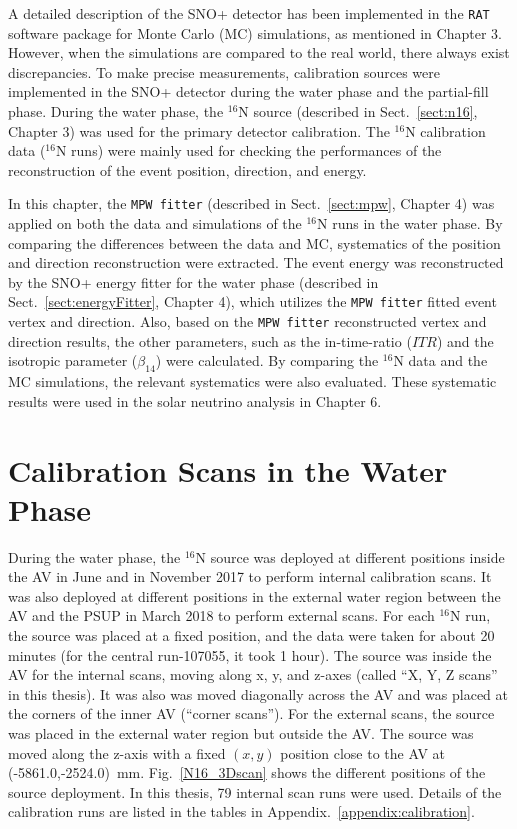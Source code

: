 A detailed description of the SNO+ detector has been implemented in the \texttt{RAT} software package for Monte Carlo (MC) simulations, as mentioned in Chapter 3. However, when the simulations are compared to the real world, there always exist discrepancies. To make precise measurements, calibration sources were implemented in the SNO+ detector during the water phase and the partial-fill phase. During the water phase, the $^{16}$N source (described in Sect.~\ref{sect:n16}, Chapter 3) was used for the primary detector calibration. The $^{16}$N calibration data ($^{16}$N runs) were mainly used for checking the performances of the reconstruction of the event position, direction, and energy. 

In this chapter, the \texttt{MPW fitter} (described in Sect.~\ref{sect:mpw}, Chapter 4) was applied on both the data and simulations of the $^{16}$N runs in the water phase. By comparing the differences between the data and MC, systematics of the position and direction reconstruction were extracted. The event energy was reconstructed by the SNO+ energy fitter for the water phase (described in Sect.~\ref{sect:energyFitter}, Chapter 4), which utilizes the \texttt{MPW fitter} fitted event vertex and direction. Also, based on the \texttt{MPW fitter} reconstructed vertex and direction results, the other parameters, such as the in-time-ratio ($ITR$) and the isotropic parameter ($\beta_{14}$) were calculated. By comparing the $^{16}$N data and the MC simulations, the relevant systematics were also evaluated. These systematic results were used in the solar neutrino analysis in Chapter 6.

\section{ Calibration Scans in the Water Phase}\label{sect:n16_water}
During the water phase, the $^{16}$N source was deployed at different positions inside the AV in June and in November 2017 to perform internal calibration scans. It was also deployed at different positions in the external water region between the AV and the PSUP in March 2018 to perform external scans. For each $^{16}$N run, the source was placed at a fixed position, and the data were taken for about 20 minutes (for the central run-107055, it took 1 hour). The source was inside the AV for the internal scans, moving along x, y, and z-axes (called ``X, Y, Z scans'' in this thesis). It was also was moved diagonally across the AV and was placed at the corners of the inner AV (``corner scans''). For the external scans, the source was placed in the external water region but outside the AV. The source was moved along the z-axis with a fixed $(x,y)$ position close to the AV at (-5861.0,-2524.0)~mm. Fig.~\ref{N16_3Dscan} shows the different positions of the source deployment. In this thesis, 79 internal scan runs were used. Details of the calibration runs are listed in the tables in Appendix.~\ref{appendix:calibration}. %

